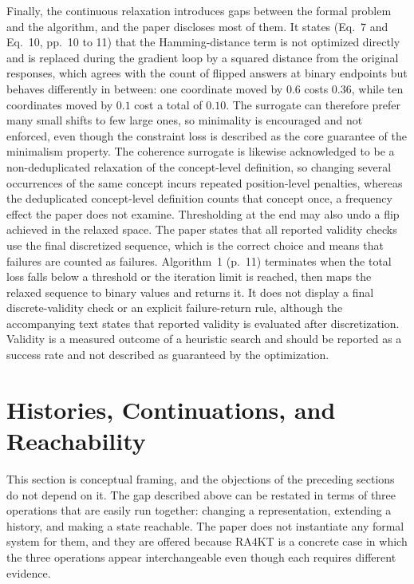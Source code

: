 \documentclass[11pt]{article}
\begin{document}
Finally, the continuous relaxation introduces gaps between the formal problem and the algorithm, and the paper discloses most of them. It states (Eq.~7 and Eq.~10, pp.~10 to 11) that the Hamming-distance term is not optimized directly and is replaced during the gradient loop by a squared distance from the original responses, which agrees with the count of flipped answers at binary endpoints but behaves differently in between: one coordinate moved by $0.6$ costs $0.36$, while ten coordinates moved by $0.1$ cost a total of $0.10$. The surrogate can therefore prefer many small shifts to few large ones, so minimality is encouraged and not enforced, even though the constraint loss is described as the core guarantee of the minimalism property. The coherence surrogate is likewise acknowledged to be a non-deduplicated relaxation of the concept-level definition, so changing several occurrences of the same concept incurs repeated position-level penalties, whereas the deduplicated concept-level definition counts that concept once, a frequency effect the paper does not examine. Thresholding at the end may also undo a flip achieved in the relaxed space. The paper states that all reported validity checks use the final discretized sequence, which is the correct choice and means that failures are counted as failures. Algorithm~1 (p.~11) terminates when the total loss falls below a threshold or the iteration limit is reached, then maps the relaxed sequence to binary values and returns it. It does not display a final discrete-validity check or an explicit failure-return rule, although the accompanying text states that reported validity is evaluated after discretization. Validity is a measured outcome of a heuristic search and should be reported as a success rate and not described as guaranteed by the optimization.

\section{Histories, Continuations, and Reachability}

This section is conceptual framing, and the objections of the preceding sections do not depend on it. The gap described above can be restated in terms of three operations that are easily run together: changing a representation, extending a history, and making a state reachable. The paper does not instantiate any formal system for them, and they are offered because RA4KT is a concrete case in which the three operations appear interchangeable even though each requires different evidence.
\end{document}
